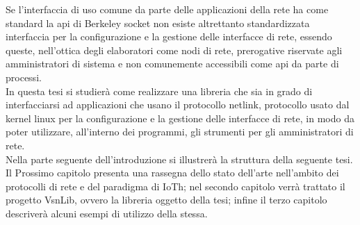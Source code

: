 Se l'interfaccia di uso comune da parte delle applicazioni della rete ha come standard la api di Berkeley socket non esiste altrettanto standardizzata interfaccia per la configurazione e la gestione delle interfacce di rete, essendo queste, nell'ottica degli elaboratori come nodi di rete, prerogative riservate agli amministratori di sistema e non comunemente accessibili come api da parte di processi.\\
In questa tesi si studier\`a come realizzare una libreria che sia in grado di interfacciarsi ad applicazioni che usano il protocollo netlink, protocollo usato dal kernel linux per la configurazione e la gestione delle interfacce di rete, in modo da poter utilizzare, all'interno dei programmi, gli strumenti per gli amministratori di rete.\\
Nella parte seguente dell'introduzione si illustrer\`a la struttura della seguente tesi.\\
Il Prossimo capitolo presenta una rassegna dello stato dell'arte nell'ambito dei protocolli di rete e del paradigma di IoTh; nel secondo capitolo verr\`a trattato il progetto VsnLib, ovvero la libreria oggetto della tesi; infine il terzo capitolo descriver\`a alcuni esempi di utilizzo della stessa.
\clearpage{\pagestyle{empty}\cleardoublepage}
\tableofcontents                        %
\rhead[\fancyplain{}{\bfseries\leftmark}]{\fancyplain{}{\bfseries\thepage}}
\clearpage{\pagestyle{empty}\cleardoublepage}
\listoffigures                          %
\clearpage{\pagestyle{empty}\cleardoublepage}
\listoftables                           %
\clearpage{\pagestyle{empty}\cleardoublepage}
